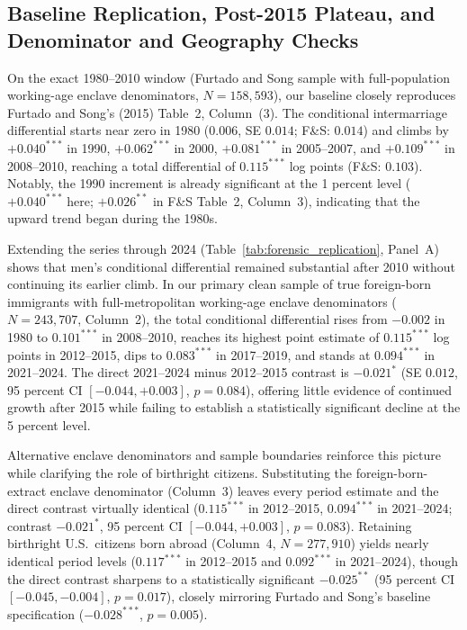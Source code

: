 \documentclass[11pt]{article}
\begin{document}
\subsection{Baseline Replication, Post-2015 Plateau, and Denominator and Geography Checks}
On the exact 1980--2010 window (Furtado and Song sample with full-population working-age enclave denominators, $N = 158{,}593$), our baseline closely reproduces Furtado and Song's (2015) Table~2, Column~(3). The conditional intermarriage differential starts near zero in 1980 ($0.006$, SE $0.014$; F\&S: $0.014$) and climbs by $+0.040^{***}$ in 1990, $+0.062^{***}$ in 2000, $+0.081^{***}$ in 2005--2007, and $+0.109^{***}$ in 2008--2010, reaching a total differential of $0.115^{***}$ log points (F\&S: $0.103$). Notably, the 1990 increment is already significant at the 1 percent level ($+0.040^{***}$ here; $+0.026^{**}$ in F\&S Table~2, Column~3), indicating that the upward trend began during the 1980s.

Extending the series through 2024 (Table~\ref{tab:forensic_replication}, Panel~A) shows that men's conditional differential remained substantial after 2010 without continuing its earlier climb. In our primary clean sample of true foreign-born immigrants with full-metropolitan working-age enclave denominators ($N = 243{,}707$, Column~2), the total conditional differential rises from $-0.002$ in 1980 to $0.101^{***}$ in 2008--2010, reaches its highest point estimate of $0.115^{***}$ log points in 2012--2015, dips to $0.083^{***}$ in 2017--2019, and stands at $0.094^{***}$ in 2021--2024. The direct 2021--2024 minus 2012--2015 contrast is $-0.021^{*}$ (SE $0.012$, 95 percent CI $[-0.044, +0.003]$, $p = 0.084$), offering little evidence of continued growth after 2015 while failing to establish a statistically significant decline at the 5 percent level.

Alternative enclave denominators and sample boundaries reinforce this picture while clarifying the role of birthright citizens. Substituting the foreign-born-extract enclave denominator (Column~3) leaves every period estimate and the direct contrast virtually identical ($0.115^{***}$ in 2012--2015, $0.094^{***}$ in 2021--2024; contrast $-0.021^{*}$, 95 percent CI $[-0.044, +0.003]$, $p = 0.083$). Retaining birthright U.S.\ citizens born abroad (Column~4, $N = 277{,}910$) yields nearly identical period levels ($0.117^{***}$ in 2012--2015 and $0.092^{***}$ in 2021--2024), though the direct contrast sharpens to a statistically significant $-0.025^{**}$ (95 percent CI $[-0.045, -0.004]$, $p = 0.017$), closely mirroring Furtado and Song's baseline specification ($-0.028^{***}$, $p = 0.005$).
\end{document}

